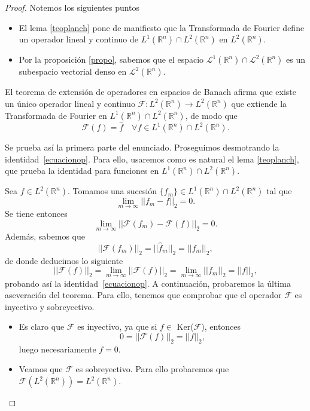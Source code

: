 \begin{proof}
Notemos los siguientes puntos 
\begin{itemize}
    \item El lema \ref{teoplanch} pone de manifiesto que la Transformada de Fourier define un operador lineal y continuo de $L^1(\mathbb{R}^n) \cap L^2(\mathbb{R}^n)$ en $L^2(\mathbb{R}^n)$.
    \item Por la proposición \ref{propo}, sabemos que el espacio $\mathscr{L}^1(\mathbb{R}^n) \cap \mathscr{L}^2(\mathbb{R}^n)$ es un subespacio vectorial denso en $\mathscr{L}^2(\mathbb{R}^n)$.
\end{itemize}

\noindent El teorema de extensión de operadores en espacios de Banach afirma que existe un único operador lineal y continuo $\mathscr{F}: L^2({\mathbb{R}^n}) \rightarrow  L^2({\mathbb{R}^n})$ que extiende la Transformada de Fourier en $L^1(\mathbb{R}^n) \cap L^2(\mathbb{R}^n)$, de modo que 
\begin{equation}
    \mathscr{F}(f) = \widehat{f} \quad \forall f \in L^1(\mathbb{R}^n) \cap L^2(\mathbb{R}^n).
\end{equation}

\noindent Se prueba así la primera parte del enunciado.
Proseguimos desmotrando la identidad~\eqref{ecuacionop}. Para ello, usaremos como es natural el lema \ref{teoplanch}, que prueba la identidad para funciones en $L^1(\mathbb{R}^n) \cap L^2(\mathbb{R}^n)$.

\noindent Sea $f \in  L^2(\mathbb{R}^n)$. Tomamos una sucesión $\{f_m\} \in   L^1(\mathbb{R}^n) \cap L^2(\mathbb{R}^n)$ tal que
\begin{equation}
    \lim_{m \rightarrow \infty}||f_m-f||_2=0.
\end{equation}
Se tiene entonces  
\begin{equation}
    \lim_{m \rightarrow \infty}||\mathscr{F}(f_m)-\mathscr{F}(f)||_2=0.
\end{equation}
Además, sabemos que 
\begin{equation}
    ||\mathscr{F}(f_m)||_2 =||\widehat{f}_m||_2  =||f_m||_2, 
\end{equation}
de donde deducimos lo siguiente 
\begin{equation}
    ||\mathscr{F}(f)||_2 =\lim_{m \rightarrow \infty}||\mathscr{F}(f)||_2 = \lim_{m \rightarrow \infty}||f_m||_2  =||f||_2,
\end{equation}
probando así la identidad~\eqref{ecuacionop}.
A continuación, probaremos la última aseveración del teorema.
Para ello, tenemos que comprobar que el operador $\mathscr{F}$ es inyectivo y sobreyectivo.
\begin{itemize}
    \item  Es claro que $\mathscr{F}$ es inyectivo, ya que si $f \in$  Ker($\mathscr{F}$), entonces 
    \begin{equation}
        0 = ||\mathscr{F}(f)||_2=||f||_2, 
    \end{equation}
    luego necesariamente $f=0$.
    \item Veamos que $\mathscr{F}$ es sobreyectivo. Para ello probaremos que $\mathscr{F}(L^2(\mathbb{R}^n)) = L^2(\mathbb{R}^n)$.


\end{itemize}
\end{proof}
